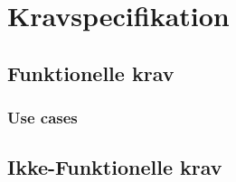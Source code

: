 \documentclass[Rapport/Rapport_main.tex]{subfiles}
\begin{document}
\section{Kravspecifikation}
\subsection{Funktionelle krav}
\subsubsection{Use cases}
\subsection{Ikke-Funktionelle krav}
\end{document}
